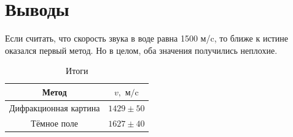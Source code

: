 \documentclass[a4paper, 12pt]{article}
\begin{document}
\section{Выводы}
Если считать, что скорость звука в воде равна 1500 м/c, то ближе к истине оказался первый метод. Но в целом, оба значения получились неплохие.
\begin{table}[H]
	\centering
	\begin{tabular}{|c|c|}
	\hline
	\textbf{Метод}        & \textbf{$v, \text{ м/c}$} \\ \hline
	Дифракционная картина & $1429 \pm 50$             \\ \hline
	Тёмное поле           & $1627 \pm 40$             \\ \hline
	\end{tabular}
	\caption{Итоги}
	\label{itog}
	\end{table}
\end{document}
